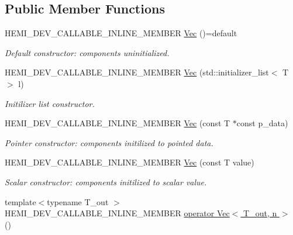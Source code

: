 \subsection*{Public Member Functions}
\begin{DoxyCompactItemize}
\item 
\hypertarget{structVec_ae64e5410222703c0e8d8a5a84880d9bc}{}H\+E\+M\+I\+\_\+\+D\+E\+V\+\_\+\+C\+A\+L\+L\+A\+B\+L\+E\+\_\+\+I\+N\+L\+I\+N\+E\+\_\+\+M\+E\+M\+B\+E\+R \hyperlink{structVec_ae64e5410222703c0e8d8a5a84880d9bc}{Vec} ()=default\label{structVec_ae64e5410222703c0e8d8a5a84880d9bc}

\begin{DoxyCompactList}\small\item\em Default constructor\+: components uninitialized. \end{DoxyCompactList}\item 
H\+E\+M\+I\+\_\+\+D\+E\+V\+\_\+\+C\+A\+L\+L\+A\+B\+L\+E\+\_\+\+I\+N\+L\+I\+N\+E\+\_\+\+M\+E\+M\+B\+E\+R \hyperlink{structVec_a1105b5b0fea459a6c0d990d717c73552}{Vec} (std\+::initializer\+\_\+list$<$ T $>$ l)
\begin{DoxyCompactList}\small\item\em Initilizer list constructor. \end{DoxyCompactList}\item 
H\+E\+M\+I\+\_\+\+D\+E\+V\+\_\+\+C\+A\+L\+L\+A\+B\+L\+E\+\_\+\+I\+N\+L\+I\+N\+E\+\_\+\+M\+E\+M\+B\+E\+R \hyperlink{structVec_a20483ba3740f996dc2ca12d2b43de450}{Vec} (const T $\ast$const p\+\_\+data)
\begin{DoxyCompactList}\small\item\em Pointer constructor\+: components initilized to pointed data. \end{DoxyCompactList}\item 
H\+E\+M\+I\+\_\+\+D\+E\+V\+\_\+\+C\+A\+L\+L\+A\+B\+L\+E\+\_\+\+I\+N\+L\+I\+N\+E\+\_\+\+M\+E\+M\+B\+E\+R \hyperlink{structVec_a2967598d684273ec428643c9846f733d}{Vec} (const T value)
\begin{DoxyCompactList}\small\item\em Scalar constructor\+: components initilized to scalar value. \end{DoxyCompactList}\item 
\hypertarget{structVec_a504a7837751bbf730dfff159708f1bc9}{}{\footnotesize template$<$typename T\+\_\+out $>$ }\\H\+E\+M\+I\+\_\+\+D\+E\+V\+\_\+\+C\+A\+L\+L\+A\+B\+L\+E\+\_\+\+I\+N\+L\+I\+N\+E\+\_\+\+M\+E\+M\+B\+E\+R \hyperlink{structVec_a504a7837751bbf730dfff159708f1bc9}{operator Vec$<$ T\+\_\+out, n $>$} ()\label{structVec_a504a7837751bbf730dfff159708f1bc9}


\end{DoxyCompactItemize}
